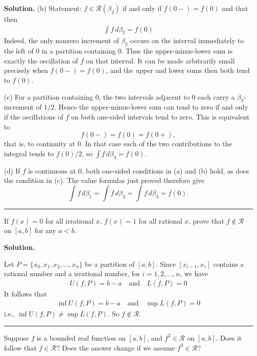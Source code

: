 \documentclass[12pt]{article}
\theoremstyle{definition}
\begin{document}
\smallskip
\noindent\textbf{Solution.}\quad
(b) Statement: $f\in\mathcal{R}(\beta_2)$ if and only if $f(0-)=f(0)$ and that then
\begin{align*}
\int f\,d\beta_2=f(0)
\end{align*}
Indeed, the only nonzero increment of $\beta_2$ occurs on the interval immediately to the left of $0$ in a partition containing $0$.  Thus the upper-minus-lower sum is exactly the oscillation of $f$ on that interval.  It can be made arbitrarily small precisely when $f(0-)=f(0)$, and the upper and lower sums then both tend to $f(0)$.

(c) For a partition containing $0$, the two intervals adjacent to $0$ each carry a $\beta_3$-increment of $1/2$.  Hence the upper-minus-lower sum can tend to zero if and only if the oscillations of $f$ on both one-sided intervals tend to zero.  This is equivalent to
\[
 f(0-)=f(0)=f(0+),
\]
that is, to continuity at $0$.  In that case each of the two contributions to the integral tends to $f(0)/2$, so $\int f\,d\beta_3=f(0)$.

(d) If $f$ is continuous at $0$, both one-sided conditions in (a) and (b) hold, as does the condition in (c).  The value formulas just proved therefore give
\[
\int f\,d\beta_1=\int f\,d\beta_2=\int f\,d\beta_3=f(0).
\]



\bigskip\noindent\hrule\bigskip

If $f(x)=0$ for all irrational $x$, $f(x)=1$ for all rational $x$, prove that $f\notin\mathcal{R}$ on $[a,b]$ for any $a<b$.

\smallskip
\noindent\textbf{Solution.}\quad

Let $P=\{x_0,x_1,x_2,\ldots,x_n\}$ be a partition of $[a,b]$. Since $[x_{i-1},x_i]$ contains a rational number and a irrational number, for $i=1,2,\ldots,n$, we have
\begin{align*}
U(f,P)=b-a\quad\mbox{and}\quad L(f,P)=0
\end{align*}
It follows that
\begin{align*}
\inf U(f,P)=b-a\quad\mbox{and}\quad \sup L(f,P)=0
\end{align*}
i.e., $\inf U(f,P)\ne\sup L(f,P)$. So $f\notin\mathcal{R}$.



\bigskip\noindent\hrule\bigskip

Suppose $f$ is a bounded real function on $[a,b]$, and $f^2\in\mathcal{R}$ on $[a,b]$. Does it follow that $f\in\mathcal{R}$? Does the answer change if we assume $f^3\in\mathcal{R}$?
\end{document}
